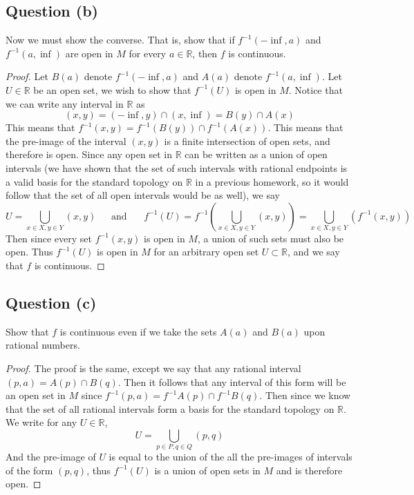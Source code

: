 \documentclass{article}
\begin{document}
    \subsection*{Question (b)}
        Now we must show the converse. That is, show that if $f^{-1}(-\inf, a)$ and $f^{-1}(a, \inf)$ are open in $M$
        for every $a \in \mathbb{R}$, then $f$ is continuous.
        \begin{proof}
            Let $B(a)$ denote $f^{-1}(-\inf, a)$ and $A(a)$ denote $f^{-1}(a, \inf)$. Let $U \in \mathbb{R}$ be
            an open set, we wish to show that $f^{-1}(U)$ is open in $M$. Notice that we can write any interval in $\mathbb{R}$
            as
            \[
                (x,y) = (-\inf, y) \cap (x, \inf) = B(y) \cap A(x)
            \]
            This means that $f^{-1}(x,y) = f^{-1}(B(y)) \cap f^{-1}(A(x))$. This means that the pre-image
            of the interval $(x,y)$ is a finite intersection of open sets, and therefore is open. Since any
            open set in $\mathbb{R}$ can be written as a union of open intervals (we have shown that the set
            of such intervals with rational endpoints is a valid basis for the standard topology on $\mathbb{R}$ in a previous homework,
            so it would follow that the set of all open intervals would be as well), we say
            \[
                U = \bigcup_{x \in X, y \in Y} (x, y) \ \ \ \ \ \ \ \text{and} \ \ \ \ \ \ \ \ f^{-1}(U) = f^{-1}\left(\bigcup_{x \in X, y \in Y}(x,y)\right) = \bigcup_{x \in X, y \in Y} (f^{-1}(x,y))
            \]
            Then since every set $f^{-1}(x,y)$ is open in $M$, a union of such sets must also be open. Thus
            $f^{-1}(U)$ is open in $M$ for an arbitrary open set $U \subset \mathbb{R}$, and we say that $f$ is continuous.
        \end{proof}
    \subsection*{Question (c)}
        Show that $f$ is continuous even if we take the sets $A(a)$ and $B(a)$ upon rational numbers.
        \begin{proof}
            The proof is the same, except we say that any rational interval $(p,a) = A(p) \cap B(q)$. Then it follows
            that any interval of this form will be an open set in $M$ since $f^{-1}(p,a) = f^{-1}A(p) \cap f^{-1}B(q)$.
            Then since we know
            that the set of all rational intervals form a basis for the standard topology on $\mathbb{R}$. We write
            for any $U \in \mathbb{R}$,
            \[
                U = \bigcup_{p \in P, q \in Q}(p,q)
            \]
            And the pre-image of $U$ is equal to the union of the all the pre-images of intervals of the form $(p,q)$,
            thus $f^{-1}(U)$ is a union of open sets in $M$ and is therefore open.
        \end{proof}
\end{document}
